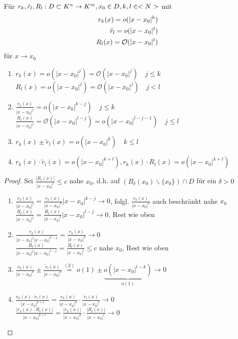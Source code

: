 \begin{proposition}
	Für $r_k,\tilde{r}_l,R_l:D\subset K^n\to K^m,x_0\in D,k,l\in<N>$ mit
	\begin{align}
		r_k(x)=o(\vert x-x_0\vert^k) \notag \\
		\tilde{r}_l=o(\vert x-x_0\vert^l) \notag \\
		R_l(x)=\mathcal{O}(\vert x-x_0\vert ^l) \notag
	\end{align}
	für $x\to x_0$
	\begin{enumerate}
		\item $r_k(x)=o(\vert x-x_0\vert^j)=\mathcal{O}(\vert x-x_0\vert^j)\quad j\le k$ \\
		$R_l(x)=o(\vert x-x_0\vert^j)=\mathcal{O}(\vert x-x_0\vert^j)\quad j<l$
		\item $\frac{r_k(x)}{\vert x-x_0\vert^j}=o(\vert x-x_0\vert^{k-j})\quad j\le k$ \\
		$\frac{R_l(x)}{\vert x-x_0\vert^j}=\mathcal{O}(\vert x-x_0\vert^{l-j})=o(\vert x-x_0\vert^{l-j-1})\quad j\le l$
		\item $r_k(x)\pm \tilde{r}_l(x)=o(\vert x-x_0\vert ^k)\quad k\le l$
		\item $r_k(x)\cdot \tilde{r}_l(x)=o(\vert x-x_0\vert^{k+l}),r_k(x)\cdot R_l(x)=o(\vert x-x_0\vert^{k+l})$
	\end{enumerate}
\end{proposition}
\begin{proof}
	Sei $\frac{\vert R_l(x)\vert}{\vert x-x_0\vert^l}\le c$ nahe $x_0$, d.h. auf $(B_{\delta}(x_0)\backslash\{x_0\})\cap D$ für ein $\delta>0$
	\begin{enumerate}
		\item $\frac{r_k(x)}{\vert x-x_0\vert^j}=\frac{r_k(x)}{\vert x-x_0\vert^k}\vert x-x_0\vert^{k-j}\to 0$, folgl. $\frac{r_k(x)}{\vert x-x_0\vert^{\delta}}$ auch beschränkt nahe $x_0$ \\
		$\frac{R_l(x)}{\vert  x-x_0\vert^j}=\frac{R_l(x)}{\vert x-x_0\vert^l}\vert x-x_0\vert^{l-j}\to 0$, Rest wie oben
		\item $\frac{r_k(x)}{\vert x-x_0\vert^j \vert x-x_0\vert^{k-j}}=\frac{r_k(x)}{\vert x-x_0\vert^k}\to 0$ \\
		$\frac{R_l(x)}{\vert x-x_0\vert^j \vert x-x_0\vert^{l-j}}=\frac{R_l(x)}{\vert x-x_0\vert^l}\le c$ nahe $x_0$, Rest wie oben
		\item $\frac{r_k(x)}{\vert x-x_0\vert^k}\pm\frac{\tilde{r}_l(x)}{\vert x-x_0\vert^k}\overset{(2)}{=}o(1)\pm\underbrace{o(\vert x-x_0\vert^{l-k})}_{o(1)}\to 0$
		\item $\frac{r_k(x)\cdot \tilde{r}_l(x)}{\vert x-x_0\vert^{k+l}}=\frac{r_k(x)}{\vert x-x_0\vert^k}\cdot\frac{\tilde{r}_l(x)}{\vert x-x_0\vert^l}\to 0$ \\
		$\frac{\vert r_k(x)\cdot R_l(x)\vert}{\vert x-x_0\vert^{k+l}}=\frac{\vert r_k(x)\vert}{\vert x-x_0\vert^k}\cdot\frac{\vert R_l(x)\vert}{\vert x-x_0\vert^l}\to 0$
	\end{enumerate}
\end{proof}

